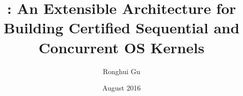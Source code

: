 \documentclass[12pt]{yalephd}
\author{Ronghui Gu}
\title{\CTOS: An Extensible Architecture for Building
Certified Sequential and Concurrent OS Kernels}
\date{August 2016}
\theoremstyle{newstyle}
\begin{document}

\maketitle
\makecopyright



\tableofcontents
\listoffigures
\listoftables
\mainmatter

%










\end{document}
